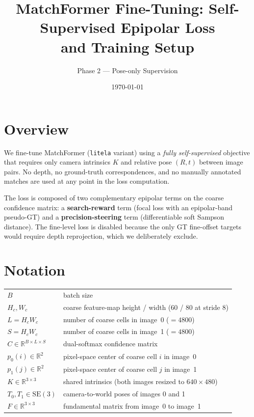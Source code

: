 \documentclass[11pt]{article}
\title{MatchFormer Fine-Tuning: Self-Supervised Epipolar Loss \\ and Training Setup}
\author{Phase 2 --- Pose-only Supervision}
\date{\today}
\begin{document}
\maketitle

\section{Overview}

We fine-tune MatchFormer (\texttt{litela} variant) using a \emph{fully
self-supervised} objective that requires only camera intrinsics $K$ and
relative pose $(R, t)$ between image pairs. No depth, no ground-truth
correspondences, and no manually annotated matches are used at any point
in the loss computation.

The loss is composed of two complementary epipolar terms on the coarse
confidence matrix: a \textbf{search-reward} term (focal loss with an
epipolar-band pseudo-GT) and a \textbf{precision-steering} term
(differentiable soft Sampson distance). The fine-level loss is disabled
because the only GT fine-offset targets would require depth
reprojection, which we deliberately exclude.

\section{Notation}

\begin{tabular}{ll}
$B$ & batch size \\
$H_c, W_c$ & coarse feature-map height / width (\num{60} / \num{80} at stride \num{8}) \\
$L = H_c W_c$ & number of coarse cells in image~0 ($=\num{4800}$) \\
$S = H_c W_c$ & number of coarse cells in image~1 ($=\num{4800}$) \\
$C \in \mathbb{R}^{B\times L \times S}$ & dual-softmax confidence matrix \\
$p_0(i) \in \mathbb{R}^2$ & pixel-space center of coarse cell $i$ in image~0 \\
$p_1(j) \in \mathbb{R}^2$ & pixel-space center of coarse cell $j$ in image~1 \\
$K \in \mathbb{R}^{3\times 3}$ & shared intrinsics (both images resized to $640\times 480$) \\
$T_0, T_1 \in \mathrm{SE}(3)$ & camera-to-world poses of images 0 and 1 \\
$F \in \mathbb{R}^{3\times 3}$ & fundamental matrix from image~0 to image~1 \\
\end{tabular}
\end{document}
